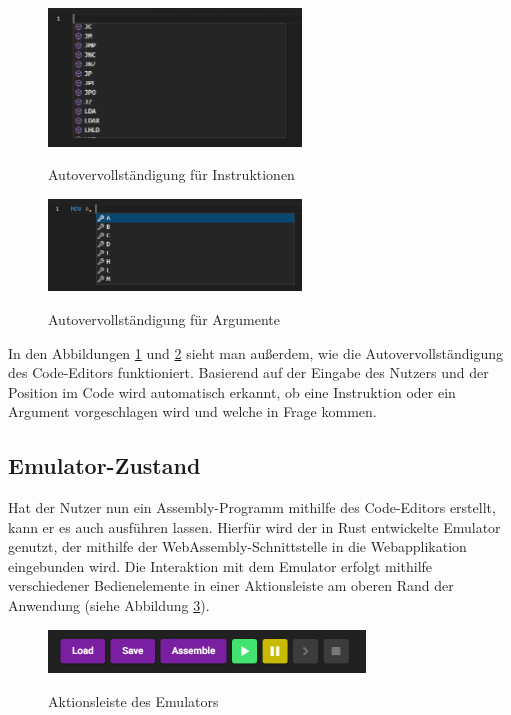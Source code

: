 \begin{figure}
    \caption{Autovervollständigung für Instruktionen}
    \centering
    \includegraphics[width=0.6\textwidth]{Bilder/Completion1.png}
    \label{fig:completion1}
\end{figure}

\begin{figure}
    \caption{Autovervollständigung für Argumente}
    \centering
    \includegraphics[width=0.6\textwidth]{Bilder/Completion2.png}
    \label{fig:completion2}
\end{figure}

In den Abbildungen \ref{fig:completion1} und \ref{fig:completion2} sieht man außerdem, wie die Autovervollständigung des Code-Editors funktioniert. Basierend auf der Eingabe des Nutzers und der Position im Code wird automatisch erkannt, ob eine Instruktion oder ein Argument vorgeschlagen wird und welche in Frage kommen.

\subsection{Emulator-Zustand}

Hat der Nutzer nun ein Assembly-Programm mithilfe des Code-Editors erstellt, kann er es auch ausführen lassen. Hierfür wird der in Rust entwickelte Emulator genutzt, der mithilfe der WebAssembly-Schnittstelle in die Webapplikation eingebunden wird. Die Interaktion mit dem Emulator erfolgt mithilfe verschiedener Bedienelemente in einer Aktionsleiste am oberen Rand der Anwendung (siehe Abbildung \ref{fig:actionbar}).

\begin{figure}[h]
    \caption{Aktionsleiste des Emulators}
    \centering
    \includegraphics[width=0.75\textwidth]{Bilder/Aktionsleiste.png}
    \label{fig:actionbar}
\end{figure}

